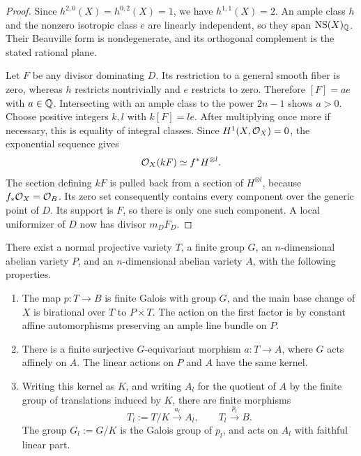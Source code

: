\begin{proof}
Since \(h^{2,0}(X)=h^{0,2}(X)=1\), we have \(h^{1,1}(X)=2\).
An ample class \(h\) and the nonzero isotropic class \(e\) are linearly
independent, so they span \(\operatorname{NS}(X)_{\mathbb Q}\).  Their Beauville form is
nondegenerate, and its orthogonal complement is the stated rational
plane.

Let \(F\) be any divisor dominating \(D\).  Its restriction to a general
smooth fiber is zero, whereas \(h\) restricts nontrivially and \(e\)
restricts to zero.  Therefore \([F]=a e\) with \(a\in\mathbb Q\).
Intersecting with an ample class to the power \(2n-1\) shows \(a>0\).
Choose positive integers \(k,l\) with \(k[F]=l e\).
After multiplying once more if necessary, this is equality of integral
classes.  Since \(H^1(X,\mathcal O_X)=0\), the exponential sequence gives
\[
                 \mathcal O_X(kF)\simeq f^*H^{\otimes l}.
\]
The section defining \(kF\) is pulled back from a section of
\(H^{\otimes l}\), because \(f_*\mathcal O_X=\mathcal O_B\).
Its zero set consequently contains every component over the generic
point of \(D\).  Its support is \(F\), so there is only one such
component.  A local uniformizer of \(D\) now has divisor \(m_DF_D\).
\end{proof}

\begin{lemma}\label{iso:abelian-model}
There exist a normal projective variety \(T\), a finite group \(G\),
an \(n\)-dimensional abelian variety \(P\), and an \(n\)-dimensional
abelian variety \(A\), with the following properties.
\begin{enumerate}
\item The map \(p:T\to B\) is finite Galois with group \(G\), and the
main base change of \(X\) is birational over \(T\) to \(P\times T\).
The action on the first factor is by constant affine automorphisms
preserving an ample line bundle on \(P\).
\item There is a finite surjective \(G\)-equivariant morphism
\(a:T\to A\), where \(G\) acts affinely on \(A\).
The linear actions on \(P\) and \(A\) have the same kernel.
\item Writing this kernel as \(K\), and writing \(A_l\) for the quotient
of \(A\) by the finite group of translations induced by \(K\), there
are finite morphisms
\[
       T_l:=T/K \xrightarrow{\ a_l\ } A_l,
       \qquad
       T_l\xrightarrow{\ p_l\ }B.
\]
The group \(G_l:=G/K\) is the Galois group of \(p_l\), and acts on
\(A_l\) with faithful linear part.
\end{enumerate}
\end{lemma}

